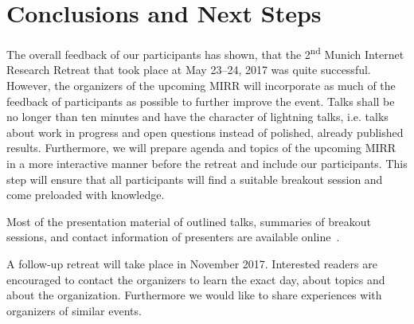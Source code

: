 \section{Conclusions and Next Steps}\label{sec:conclusion}


The overall feedback of our participants has shown, that the 2\textsuperscript{nd} Munich Internet Research Retreat that took place at May 23--24, 2017 was quite successful. However, the organizers of the upcoming \ac{MIRR} will incorporate as much of the feedback of participants as possible to further improve the event. Talks shall be no longer than ten minutes and have the character of lightning talks, i.e. talks about work in progress and open questions instead of polished, already published results. Furthermore, we will prepare agenda and topics of the upcoming \ac{MIRR} in a more interactive manner before the retreat and include our participants. This step will ensure that all participants will find a suitable breakout session and come preloaded with knowledge.

Most of the presentation material of outlined talks, summaries of breakout sessions, and contact information of presenters are available online~\cite{mir-materials}.

A follow-up retreat will take place in November 2017. Interested readers are encouraged to contact the organizers to learn the exact day, about topics and about the organization. Furthermore we would like to share experiences with organizers of similar events. 
